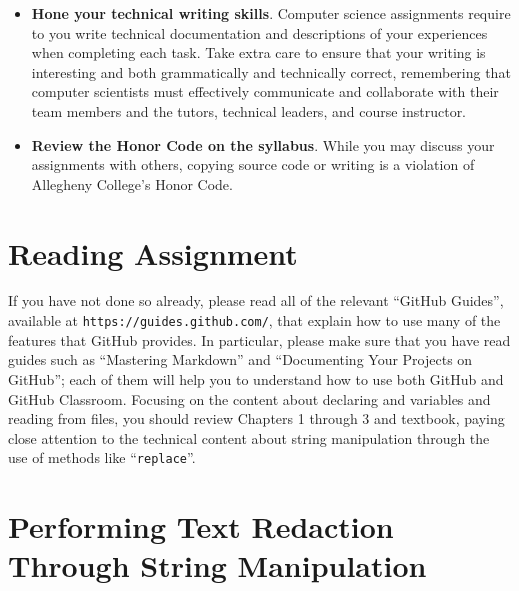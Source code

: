 \documentclass[11pt]{article}
\newcommand{\command}[1]{``\lstinline{#1}''}
\newcommand{\url}[1]{\lstinline{#1}}
\begin{document}
\begin{itemize}
\item {\bf Hone your technical writing skills}. Computer science assignments
  require to you write technical documentation and descriptions of your
  experiences when completing each task. Take extra care to ensure that your
  writing is interesting and both grammatically and technically correct,
  remembering that computer scientists must effectively communicate and
  collaborate with their team members and the tutors, technical leaders, and
  course instructor.

\item {\bf Review the Honor Code on the syllabus}. While you may discuss your
  assignments with others, copying source code or writing is a violation of
  Allegheny College's Honor Code.

\end{itemize}

\section*{Reading Assignment}

If you have not done so already, please read all of the relevant ``GitHub
Guides'', available at \url{https://guides.github.com/}, that explain how to use
many of the features that GitHub provides. In particular, please make sure that
you have read guides such as ``Mastering Markdown'' and ``Documenting Your
Projects on GitHub''; each of them will help you to understand how to use both
GitHub and GitHub Classroom. Focusing on the content about declaring and
variables and reading from files, you should review Chapters 1 through 3 and
textbook, paying close attention to the technical content about string
manipulation through the use of methods like \command{replace}.

\section*{Performing Text Redaction Through String Manipulation}
\end{document}
